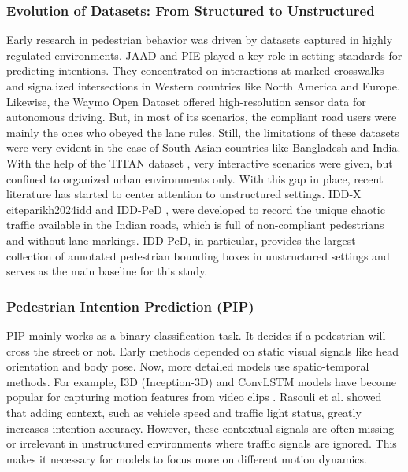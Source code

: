 \documentclass[12pt, a4paper]{article}
\begin{document}
\subsubsection{Evolution of Datasets: From Structured to Unstructured}
Early research in pedestrian behavior was driven by datasets captured in highly regulated environments. JAAD \cite{rasouli2017are} and PIE \cite{rasouli2019pie} played a key role in setting standards for predicting intentions. They concentrated on interactions at marked crosswalks and signalized intersections in Western countries like North America and Europe. Likewise, the Waymo Open Dataset \cite{sun2020scalability} offered high-resolution sensor data for autonomous driving. But, in most of its scenarios, the compliant road users were mainly the ones who obeyed the lane rules. Still, the limitations of these datasets were very evident in the case of South Asian countries like Bangladesh and India. With the help of the TITAN dataset \cite{malla2020titan}, very interactive scenarios were given, but confined to organized urban environments only. With this gap in place, recent literature has started to center attention to unstructured settings. IDD-X cite{parikh2024idd} and IDD-PeD \cite{bokkasam2025pedestrian}, were developed to record the unique chaotic traffic available in the Indian roads, which is full of non-compliant pedestrians and without lane markings. IDD-PeD, in particular, provides the largest collection of annotated pedestrian bounding boxes in unstructured settings and serves as the main baseline for this study.

\subsubsection{Pedestrian Intention Prediction (PIP)}
PIP mainly works as a binary classification task. It decides if a pedestrian will cross the street or not. Early methods depended on static visual signals like head orientation and body pose. Now, more detailed models use spatio-temporal methods. For example, I3D (Inception-3D) and ConvLSTM models have become popular for capturing motion features from video clips \cite{bokkasam2025pedestrian}. Rasouli et al. \cite{rasouli2019pie} showed that adding context, such as vehicle speed and traffic light status, greatly increases intention accuracy. However, these contextual signals are often missing or irrelevant in unstructured environments where traffic signals are ignored. This makes it necessary for models to focus more on different motion dynamics.
\end{document}
